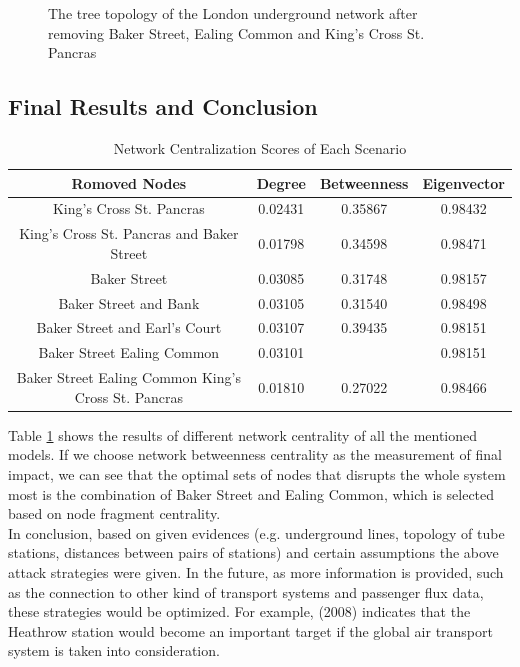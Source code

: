 \documentclass[a4paper,reqno,]{article}
\begin{document}
\begin{figure}[H]
\begin{minipage}[b]{0.5\textwidth}
    \caption{The tree topology of the London underground network after removing Baker Street, Ealing Common and King's Cross St. Pancras}\label{fig: 7_2}
\end{minipage}
\end{figure} 

\subsection{Final Results and Conclusion}
\label{ssec:finalresult}
\begin{table}[H]
  \centering
    \begin{tabular}{*4{c}}
    \toprule
    Romoved Nodes & \multicolumn{1}{c}{Degree} & \multicolumn{1}{c}{Betweenness} & \multicolumn{1}{c}{Eigenvector} \\
    \midrule
    King's Cross St. Pancras & 0.02431 & 0.35867 & 0.98432 \\
    King's Cross St. Pancras and Baker Street & 0.01798 & 0.34598 & 0.98471 \\
    Baker Street & 0.03085 & 0.31748 & 0.98157 \\
    Baker Street and Bank & 0.03105 & 0.31540 & 0.98498 \\
    Baker Street and Earl's Court & 0.03107 & 0.39435 & 0.98151 \\
    Baker Street  Ealing Common & 0.03101 & \cellcolor{Gray}{0.21971} & 0.98151 \\
    Baker Street  Ealing Common King's Cross St. Pancras & 0.01810 & 0.27022 & 0.98466 \\
    \bottomrule
    \end{tabular}%
    \caption{Network Centralization Scores of Each Scenario}
  \label{tab: model_result}%
\end{table}%
Table \ref{tab: model_result} shows the results of different network centrality of all the mentioned models. If we choose network betweenness centrality as the measurement of final impact,  we can see that the optimal sets of nodes that disrupts the whole system most is the combination of Baker Street and Ealing Common, which is selected based on node fragment centrality. 
\\In conclusion, based on given evidences (e.g. underground lines, topology of tube stations, distances between pairs of stations) and certain assumptions the above attack strategies were given. In the future, as more information is provided, such as the connection to other kind of transport systems and passenger flux data, these strategies would be optimized. For example, \citeauthor{jordan2008predicting} (2008) indicates that the Heathrow station would become an important target if the global air transport system is taken into consideration. 
\end{document}

